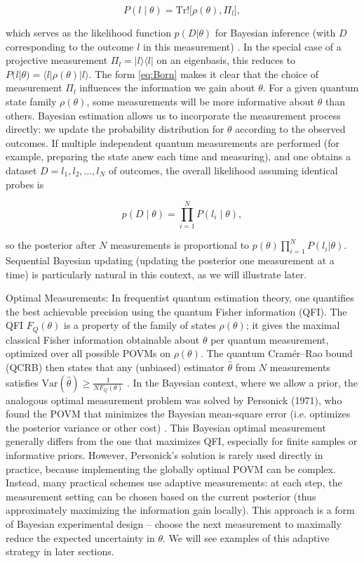 \begin{equation}

P(l \mid \theta) = \mathrm{Tr}!\big[\rho(\theta), \Pi_l\big],

\label{eq:Born}

\end{equation}

which serves as the likelihood function $p(D|\theta)$ for Bayesian
inference (with $D$ corresponding to the outcome $l$ in this
measurement) . In the special case of a projective measurement ${\Pi_l
  = |l\rangle\langle l|}$ on an eigenbasis, this reduces to
$P(l|\theta) = \langle l|\rho(\theta)|l\rangle$. The form
\eqref{eq:Born} makes it clear that the choice of measurement
${\Pi_l}$ influences the information we gain about $\theta$. For a
given quantum state family $\rho(\theta)$, some measurements will be
more informative about $\theta$ than others. Bayesian estimation
allows us to incorporate the measurement process directly: we update
the probability distribution for $\theta$ according to the observed
outcomes. If multiple independent quantum measurements are performed
(for example, preparing the state anew each time and measuring), and
one obtains a dataset $D = {l_1, l_2, \dots, l_N}$ of outcomes, the
overall likelihood assuming identical probes is

\[
p(D \mid \theta) = \prod_{i=1}^N P(l_i \mid \theta),
\]

so the posterior after $N$ measurements is proportional to $p(\theta)
\prod_{i=1}^N P(l_i|\theta)$. Sequential Bayesian updating (updating
the posterior one measurement at a time) is particularly natural in
this context, as we will illustrate later.



Optimal Measurements: In frequentist quantum estimation theory, one
quantifies the best achievable precision using the quantum Fisher
information (QFI). The QFI $F_Q(\theta)$ is a property of the family
of states $\rho(\theta)$; it gives the maximal classical Fisher
information obtainable about $\theta$ per quantum measurement,
optimized over all possible POVMs on $\rho(\theta)$. The quantum
Cramér–Rao bound (QCRB) then states that any (unbiased) estimator
$\hat{\theta}$ from $N$ measurements satisfies
$\mathrm{Var}(\hat{\theta}) \ge \frac{1}{N F_Q(\theta)}$ . In the
Bayesian context, where we allow a prior, the analogous optimal
measurement problem was solved by Personick (1971), who found the POVM
that minimizes the Bayesian mean-square error (i.e. optimizes the
posterior variance or other cost) . This Bayesian optimal measurement
generally differs from the one that maximizes QFI, especially for
finite samples or informative priors. However, Personick’s solution is
rarely used directly in practice, because implementing the globally
optimal POVM can be complex. Instead, many practical schemes use
adaptive measurements: at each step, the measurement setting can be
chosen based on the current posterior (thus approximately maximizing
the information gain locally). This approach is a form of Bayesian
experimental design – choose the next measurement to maximally reduce
the expected uncertainty in $\theta$. We will see examples of this
adaptive strategy in later sections.




